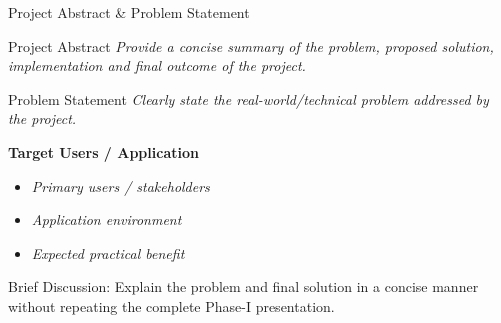 \documentclass[aspectratio=169,11pt]{beamer}
\newcommand{\smallnote}[1]{%
\vspace{0.08cm}
{\scriptsize\color{GEUGrey}#1}
}
\newcommand{\placeholder}[1]{%
\textit{\color{GEUGrey}#1}
}
\begin{document}
\begin{frame}{Project Abstract \& Problem Statement}

\begin{block}{Project Abstract}
\placeholder{
Provide a concise summary of the problem, proposed solution,
implementation and final outcome of the project.
}
\end{block}

\vspace{2mm}

\begin{block}{Problem Statement}
\placeholder{
Clearly state the real-world/technical problem addressed by the project.
}
\end{block}

\vspace{2mm}

\textbf{\color{GEUBlue}Target Users / Application}

\begin{itemize}\itemsep2pt
    \item \placeholder{Primary users / stakeholders}
    \item \placeholder{Application environment}
    \item \placeholder{Expected practical benefit}
\end{itemize}

\smallnote{
Brief Discussion: Explain the problem and final solution in a concise
manner without repeating the complete Phase-I presentation.
}

\end{frame}
\end{document}
